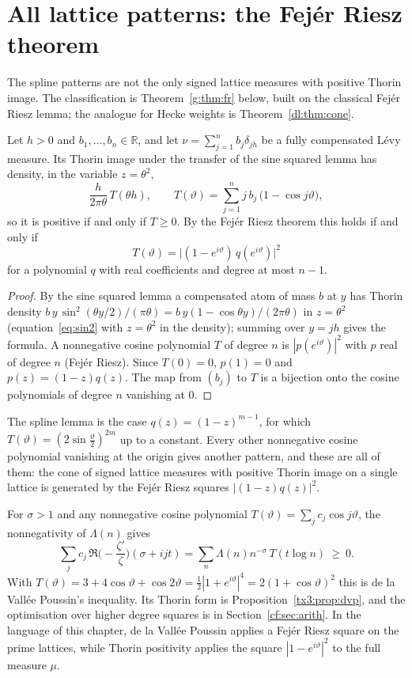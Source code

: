\section{All lattice patterns: the Fej\'er Riesz theorem}\label{g:sec:fr}

The spline patterns are not the only signed lattice measures with positive Thorin image. The classification is Theorem~\ref{g:thm:fr} below, built on the classical Fej\'er Riesz lemma; the analogue for Hecke weights is Theorem~\ref{dl:thm:cone}.

\begin{theorem}\label{g:thm:fr}
Let $h>0$ and $b_1,\dots,b_n\in\mathbb R$, and let $\nu=\sum_{j=1}^nb_j\delta_{jh}$ be a fully compensated L\'evy measure. Its Thorin image under the transfer of the sine squared lemma has density, in the variable $z=\theta^2$,
\[
\frac{h}{2\pi\theta}\,T(\theta h),\qquad T(\vartheta)=\sum_{j=1}^n j\,b_j\,\big(1-\cos j\vartheta\big),
\]
so it is positive if and only if $T\ge0$. By the Fej\'er Riesz theorem this holds if and only if
\[
T(\vartheta)=\big|(1-e^{i\vartheta})\,q(e^{i\vartheta})\big|^2
\]
for a polynomial $q$ with real coefficients and degree at most $n-1$.
\end{theorem}

\begin{proof}
By the sine squared lemma a compensated atom of mass $b$ at $y$ has Thorin density $b\,y\,\sin^2(\theta y/2)/(\pi\theta)=b\,y(1-\cos\theta y)/(2\pi\theta)$ in $z=\theta^2$ (equation~\eqref{eq:sin2} with $z=\theta^2$ in the density); summing over $y=jh$ gives the formula. A nonnegative cosine polynomial $T$ of degree $n$ is $|p(e^{i\vartheta})|^2$ with $p$ real of degree $n$ (Fej\'er Riesz). Since $T(0)=0$, $p(1)=0$ and $p(z)=(1-z)q(z)$. The map from $(b_j)$ to $T$ is a bijection onto the cosine polynomials of degree $n$ vanishing at $0$.
\end{proof}

The spline lemma is the case $q(z)=(1-z)^{m-1}$, for which $T(\vartheta)=(2\sin\frac\vartheta2)^{2m}$ up to a constant. Every other nonnegative cosine polynomial vanishing at the origin gives another pattern, and these are all of them: the cone of signed lattice measures with positive Thorin image on a single lattice is generated by the Fej\'er Riesz squares $|(1-z)q(z)|^2$.

\begin{remark}\label{g:rem:dvp}
For $\sigma>1$ and any nonnegative cosine polynomial $T(\vartheta)=\sum_jc_j\cos j\vartheta$, the nonnegativity of $\Lambda(n)$ gives
\[
\sum_jc_j\,\Re\Big(-\frac{\zeta'}{\zeta}\Big)(\sigma+ijt)=\sum_n\Lambda(n)n^{-\sigma}\,T(t\log n)\ \ge\ 0 .
\]
With $T(\vartheta)=3+4\cos\vartheta+\cos2\vartheta=\frac12|1+e^{i\vartheta}|^4=2(1+\cos\vartheta)^2$ this is de la Vall\'ee Poussin's inequality. Its Thorin form is Proposition~\ref{tx3:prop:dvp}, and the optimisation over higher degree squares is in Section~\ref{cf:sec:arith}. In the language of this chapter, de la Vall\'ee Poussin applies a Fej\'er Riesz square on the prime lattices, while Thorin positivity applies the square $|1-e^{i\vartheta}|^2$ to the full measure $\mu$.
\end{remark}

